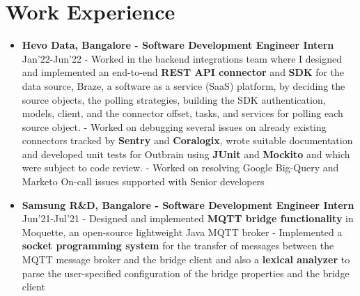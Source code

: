 \documentclass{article}
\begin{document}
\section*{Work Experience}

\begin{itemize}

    \item{\textbf{\large{Hevo Data, Bangalore - Software Development Engineer Intern}}} \hfill \textmd{Jan'22-Jun'22}
          \newline
          \textmd{- Worked in the backend integrations team where I designed and implemented an end-to-end \textbf{REST API connector} and \textbf{SDK} for the data source, Braze, a software as a service (SaaS) platform, by deciding the source objects, the polling strategies, building the SDK authentication, models, client, and the connector offset, tasks, and services for polling each source object.}
          \newline
          \textmd{- Worked on debugging several issues on already existing connectors tracked by \textbf{Sentry} and \textbf{Coralogix}, wrote suitable documentation and developed unit tests for Outbrain using \textbf{JUnit} and \textbf{Mockito} and which were subject to code review.}
          \newline
          \textmd{- Worked on resolving Google Big-Query and Marketo On-call issues supported with Senior developers}

    \item{\textbf{\large{Samsung R\&D, Bangalore - Software Development Engineer Intern}}} \hfill \textmd{Jun'21-Jul'21}
          \newline
          \textmd{- Designed and implemented \textbf{MQTT bridge functionality} in Moquette, an open-source lightweight Java MQTT broker}
          \newline
          \textmd{- Implemented a \textbf{socket programming system} for the transfer of messages between the MQTT message broker and the bridge client and also a \textbf{lexical analyzer} to parse the user-specified configuration of the bridge properties and the bridge client}


\end{itemize}
\end{document}
